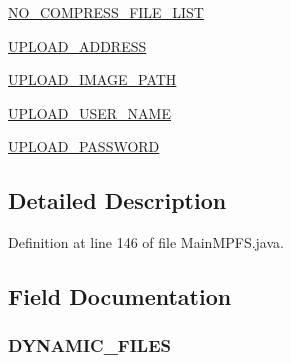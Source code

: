 \begin{DoxyCompactItemize}
\item 
\hyperlink{enum_microchip_m_p_f_s_1_1_main_m_p_f_s_1_1e_xml_node_attribute_a68fa1f3ee92221a0449eeccdd18d3a3f}{N\+O\+\_\+\+C\+O\+M\+P\+R\+E\+S\+S\+\_\+\+F\+I\+L\+E\+\_\+\+L\+I\+S\+T}
\item 
\hyperlink{enum_microchip_m_p_f_s_1_1_main_m_p_f_s_1_1e_xml_node_attribute_a938068193c07160f3bac8c6eabfdeece}{U\+P\+L\+O\+A\+D\+\_\+\+A\+D\+D\+R\+E\+S\+S}
\item 
\hyperlink{enum_microchip_m_p_f_s_1_1_main_m_p_f_s_1_1e_xml_node_attribute_a7ec52711335240ea4c569ba1013b893f}{U\+P\+L\+O\+A\+D\+\_\+\+I\+M\+A\+G\+E\+\_\+\+P\+A\+T\+H}
\item 
\hyperlink{enum_microchip_m_p_f_s_1_1_main_m_p_f_s_1_1e_xml_node_attribute_ae8dd10b4ffc415ad9367d10bfd04d68c}{U\+P\+L\+O\+A\+D\+\_\+\+U\+S\+E\+R\+\_\+\+N\+A\+M\+E}
\item 
\hyperlink{enum_microchip_m_p_f_s_1_1_main_m_p_f_s_1_1e_xml_node_attribute_ad36e60148e6bcbbaf70094f317c112ec}{U\+P\+L\+O\+A\+D\+\_\+\+P\+A\+S\+S\+W\+O\+R\+D}
\end{DoxyCompactItemize}


\subsection{Detailed Description}


Definition at line 146 of file Main\+M\+P\+F\+S.\+java.



\subsection{Field Documentation}
\hypertarget{enum_microchip_m_p_f_s_1_1_main_m_p_f_s_1_1e_xml_node_attribute_a6b7d361f5c7d3210c1920d1b1607ab2c}{}
\subsubsection[{D\+Y\+N\+A\+M\+I\+C\+\_\+\+F\+I\+L\+E\+S}]{\setlength{\rightskip}{0pt plus 5cm}D\+Y\+N\+A\+M\+I\+C\+\_\+\+F\+I\+L\+E\+S}\label{enum_microchip_m_p_f_s_1_1_main_m_p_f_s_1_1e_xml_node_attribute_a6b7d361f5c7d3210c1920d1b1607ab2c}


